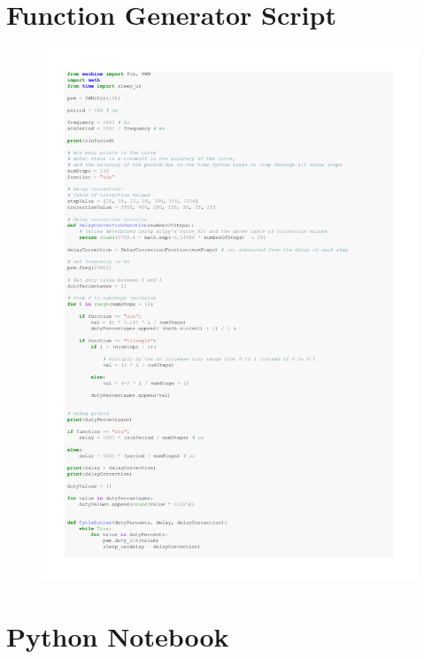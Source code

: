 \documentclass[%
 reprint,
 amsmath,amssymb,
 aps,
]{revtex4-2}
\begin{document}
\section{Function Generator Script}
    \begin{figure}[h]
        \includegraphics[width=\columnwidth]{Images/functionGenerator.pdf}
    \end{figure}


\clearpage
\section{Python Notebook}
\end{document}
